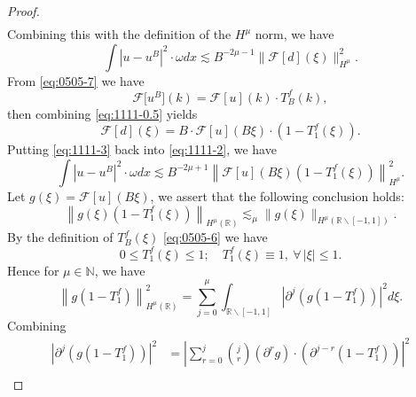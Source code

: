 \documentclass[pdflatex,sn-aps]{sn-jnl}%
\theoremstyle{thmstyleone}%
\theoremstyle{thmstyletwo}%
\theoremstyle{thmstylethree}%
\begin{document}
\begin{proof}
\begin{equation}
\begin{aligned}
    \end{aligned}
  \end{equation}
  Combining this with the definition of the $H^\mu$ norm, we have
  \begin{equation}\label{eq:1111-2}
    \int\left|u-u^B\right|^2 \cdot \omega d x \lesssim B^{-2 \mu-1}\bigl\|\mathcal{F}[d](\xi)\bigr\|_{H^\mu}^2.
  \end{equation}
  From \eqref{eq:0505-7} we have
  \begin{equation}\label{eq:0505-22}
    \mathcal{F}\bigl[u^B\bigr](k)=\mathcal{F}[u](k) \cdot T_B^f(k),
  \end{equation}
  then combining \eqref{eq:1111-0.5} yields
  \begin{equation}\label{eq:1111-3}
    \mathcal{F}[d](\xi)=B \cdot \mathcal{F}[u](B \xi) \cdot \left(1-T_1^f(\xi)\right).
  \end{equation}
  Putting \eqref{eq:1111-3} back into \eqref{eq:1111-2}, we have
  \begin{equation}\label{eq:1111-4}
    \int \left|u-u^B\right|^2 \cdot \omega d x \lesssim B^{-2 \mu+1} \left\| \mathcal{F}[u](B \xi)\left(1-T_1^f(\xi)\right)\right\|_{H^\mu}^2.
  \end{equation}
  Let $g(\xi) = \mathcal{F}[u](B\xi)$, we assert that the following conclusion holds:
  \begin{equation}\label{eq:1111-5}
    \left\|g(\xi)\left(1-T_1^f(\xi)\right)\right\|_{H^\mu(\mathbb{R})} \lesssim_\mu \bigl\|g(\xi)\bigr\|_{H^{\mu}\left(\mathbb{R}\backslash [-1,1]\right)}.
  \end{equation}
  By the definition of $T_B^f(\xi)$ \eqref{eq:0505-6} we have
  \begin{equation}\label{eq:0505-23}
    0 \leqslant T_1^f(\xi) \leqslant 1; \quad T_1^f(\xi) \equiv 1,\ \forall\,|\xi| \leqslant 1.
  \end{equation}
  Hence for $\mu \in \mathbb{N}$, we have
  \begin{equation}\label{eq:1111-6}
    \left\|g\left(1-T_1^f\right)\right\|_{H^\mu(\mathbb{R})}^2=\sum_{j=0}^\mu \int_{\mathbb{R} \backslash[-1,1]}\left|\partial^j\left(g\left(1-T_1^f\right)\right)\right|^2 d \xi.
  \end{equation}
  Combining
  \begin{equation}\label{eq:1111-7}
    \begin{aligned}
    \left|\partial^j\left(g\left(1-T_1^f\right)\right)\right|^2 & =\left|\sum_{r=0}^j\binom{j}{r}\left(\partial^r g\right) \cdot\left(\partial^{j-r}\left(1-T_1^f\right)\right)\right|^2 \\

\end{aligned}
\end{equation}
\end{proof}
\end{document}
